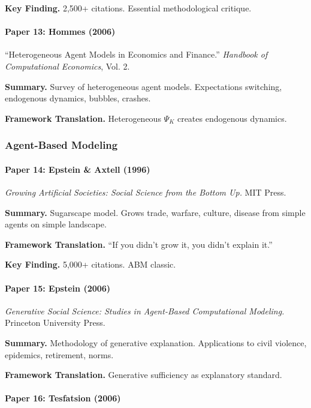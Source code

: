 \textbf{Key Finding.}
2,500+ citations. Essential methodological critique.

\paragraph{Paper 13: Hommes (2006)}

``Heterogeneous Agent Models in Economics and Finance.''
\textit{Handbook of Computational Economics}, Vol. 2.

\textbf{Summary.}
Survey of heterogeneous agent models. Expectations switching, 
endogenous dynamics, bubbles, crashes.

\textbf{Framework Translation.}
Heterogeneous $\Psi_K$ creates endogenous dynamics.

\subsubsection{Agent-Based Modeling}

\paragraph{Paper 14: Epstein \& Axtell (1996)}

\textit{Growing Artificial Societies: Social Science from the Bottom Up.}
MIT Press.

\textbf{Summary.}
Sugarscape model. Grows trade, warfare, culture, disease from 
simple agents on simple landscape.

\textbf{Framework Translation.}
``If you didn't grow it, you didn't explain it.''

\textbf{Key Finding.}
5,000+ citations. ABM classic.

\paragraph{Paper 15: Epstein (2006)}

\textit{Generative Social Science: Studies in Agent-Based Computational Modeling.}
Princeton University Press.

\textbf{Summary.}
Methodology of generative explanation. Applications to civil violence, 
epidemics, retirement, norms.

\textbf{Framework Translation.}
Generative sufficiency as explanatory standard.

\paragraph{Paper 16: Tesfatsion (2006)}

